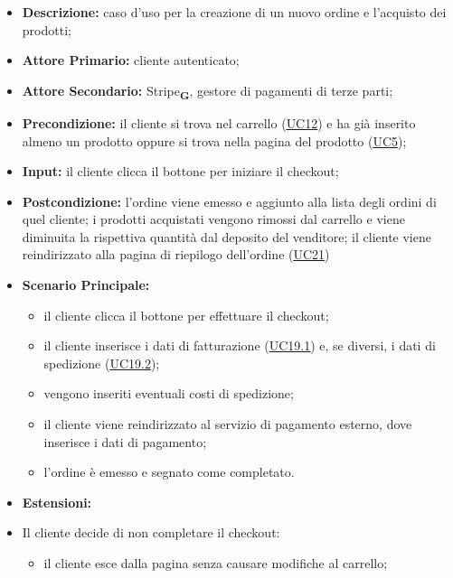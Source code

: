 \begin{itemize}
    \item \textbf{Descrizione:} caso d'uso per la creazione di un nuovo ordine e l'acquisto dei prodotti;
    \item \textbf{Attore Primario:} cliente autenticato;
    \item \textbf{Attore Secondario:} Stripe\textsubscript{\textbf{G}}, gestore di pagamenti di terze parti;
    \item \textbf{Precondizione:} il cliente si trova nel carrello (\hyperref[sec:UC12]{\underline{UC12}}) e ha già inserito almeno un prodotto oppure si trova nella pagina del prodotto (\hyperref[sec:UC5]{\underline{UC5}});
    \item \textbf{Input:} il cliente clicca il bottone per iniziare il checkout;
    \item \textbf{Postcondizione:} l'ordine viene emesso e aggiunto alla lista degli ordini di quel cliente; i prodotti acquistati vengono rimossi dal carrello e viene diminuita la rispettiva quantità dal deposito del venditore; il cliente viene reindirizzato alla pagina di riepilogo dell'ordine (\hyperref[sec:UC21]{\underline{UC21}})
    \item \textbf{Scenario Principale:}
          \begin{itemize}
              \item il cliente clicca il bottone per effettuare il checkout;
              \item il cliente inserisce i dati di fatturazione (\hyperref[sec:UC19.1]{\underline{UC19.1}}) e, se diversi, i dati di spedizione (\hyperref[sec:UC19.2]{\underline{UC19.2}});
              \item vengono inseriti eventuali costi di spedizione;
              \item il cliente viene reindirizzato al servizio di pagamento esterno, dove inserisce i dati di pagamento;
              \item l'ordine è emesso e segnato come completato.
          \end{itemize}
    \item \textbf{Estensioni:}
    \item Il cliente decide di non completare il checkout:
          \begin{itemize}
              \item  il cliente esce dalla pagina senza causare modifiche al carrello;
          \end{itemize}
\end{itemize}
